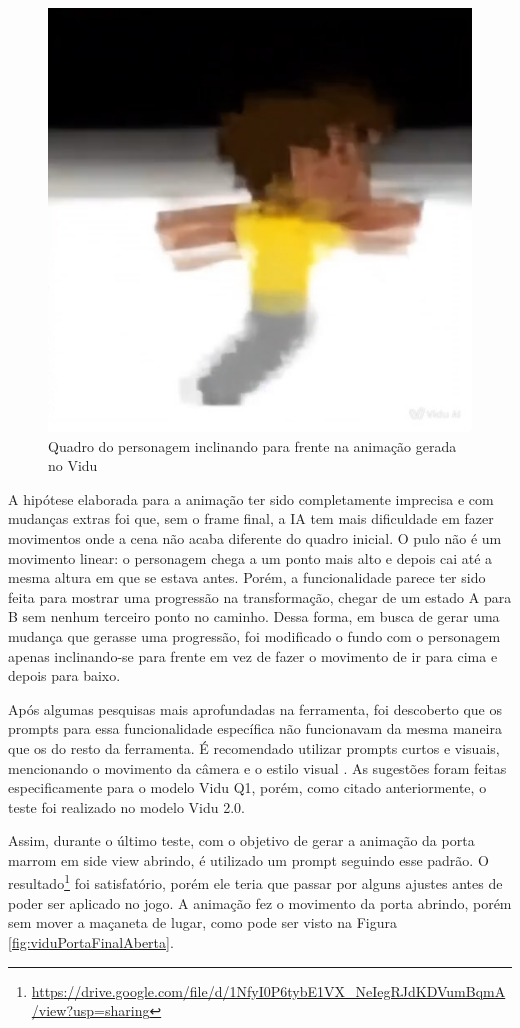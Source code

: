 \begin{figure}[htbp]
    \centering
    \caption{\small Quadro do personagem inclinando para frente na animação gerada no Vidu}
    \label{fig:viduPuloInclina}
    \includegraphics[width=0.4\linewidth]{figs/vidu/framePulo2.jpg}
\end{figure}

A hipótese elaborada para a animação ter sido completamente imprecisa e com mudanças extras foi que, sem o frame final, a IA tem mais dificuldade em fazer movimentos onde a cena não acaba diferente do quadro inicial. O pulo não é um movimento linear: o personagem chega a um ponto mais alto e depois cai até a mesma altura em que se estava antes. Porém, a funcionalidade parece ter sido feita para mostrar uma progressão na transformação, chegar de um estado A para B sem nenhum terceiro ponto no caminho. Dessa forma, em busca de gerar uma mudança que gerasse uma progressão, foi modificado o fundo com o personagem apenas inclinando-se para frente em vez de fazer o movimento de ir para cima e depois para baixo.


Após algumas pesquisas mais aprofundadas na ferramenta, foi descoberto que os prompts para essa funcionalidade específica não funcionavam da mesma maneira que os do resto da ferramenta. É recomendado utilizar prompts curtos e visuais, mencionando o movimento da câmera e o estilo visual \cite{docs2_2025}. As sugestões foram feitas especificamente para o modelo Vidu Q1, porém, como citado anteriormente, o teste foi realizado no modelo Vidu 2.0.

Assim, durante o último teste, com o objetivo de gerar a animação da porta marrom em side view abrindo, é utilizado um prompt seguindo esse padrão. O resultado\footnote{\url{https://drive.google.com/file/d/1NfyI0P6tybE1VX_NeIegRJdKDVumBqmA/view?usp=sharing}} foi satisfatório, porém ele teria que passar por alguns ajustes antes de poder ser aplicado no jogo. A animação fez o movimento da porta abrindo, porém sem mover a maçaneta de lugar, como pode ser visto na Figura \ref{fig:viduPortaFinalAberta}.

